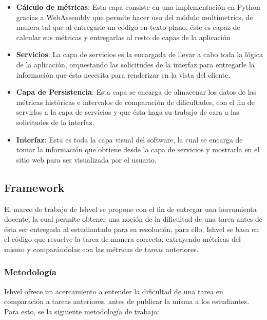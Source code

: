 \documentclass[letterpaper,12pt]{article}
\begin{document}
\begin{itemize}
  \item \textbf{Cálculo de métricas}: Esta capa consiste en una implementación en Python gracias a WebAssembly que permite hacer uso del módulo multimetrics\cite{privkweihmann_multimetricprog}, de manera tal que al entregarle un código en texto plano, éste es capaz de calcular sus métricas y entregarlas al resto de capas de la aplicación
  \item \textbf{Servicios}: La capa de servicios es la encargada de llevar a cabo toda la lógica de la aplicación, orquestando las solicitudes de la interfaz para entregarle la información que ésta necesita para renderizar en la vista del cliente.
  \item \textbf{Capa de Persistencia}: Esta capa se encarga de almacenar los datos de las métricas históricas e intervalos de comparación de dificultades, con el fin de servirlos a la capa de servicios y que ésta haga su trabajo de cara a las solicitudes de la interfaz.
  \item \textbf{Interfaz}: Esta es toda la capa visual del software, la cual se encarga de tomar la información que obtiene desde la capa de servicios y mostrarla en el sitio web para ser visualizada por el usuario.
\end{itemize}

\subsection{Framework}

El marco de trabajo de Ishvel se propone con el fin de entregar una herramienta docente, la cual permite obtener una noción de la dificultad de una tarea antes de ésta ser entregada al estudiantado para su resolución, para ello, Ishvel se basa en el código que resuelve la tarea de manera correcta, extrayendo métricas del mismo y comparándolas con las métricas de tareas anteriores.

\subsubsection{Metodología}

Ishvel ofrece un acercamiento a entender la dificultad de una tarea en comparación a tareas anteriores, antes de publicar la misma a los estudiantes. Para esto, se la siguiente metodología de trabajo:
\end{document}
